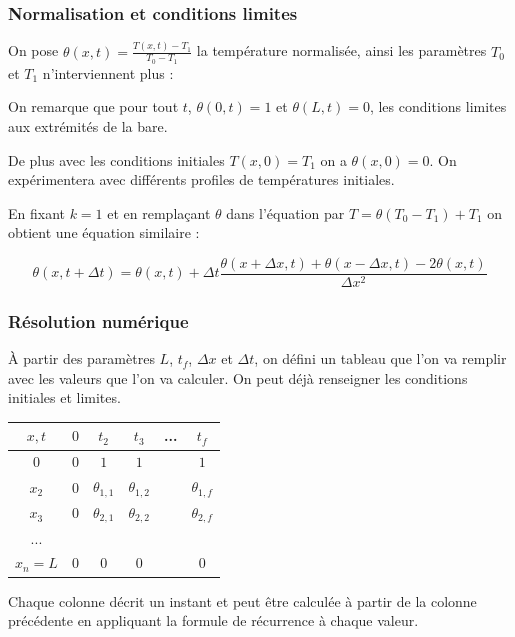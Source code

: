 \documentclass{beamer}
\begin{document}
    \begin{frame}
    \frametitle{Normalisation et conditions limites}


    On pose $\theta(x,t) = \frac{T(x,t) -T_1}{T_0 - T_1}$ la température normalisée,
    ainsi les paramètres $T_0$ et $T_1$ n'interviennent plus :

    \medskip

    On remarque que pour tout $t$, $\theta(0, t) = 1$ et $\theta(L, t) = 0$, les conditions limites aux extrémités de la bare.

    \medskip

    De plus avec les conditions initiales $T(x,0)=T_1$ on a $\theta(x, 0) = 0$. On expérimentera avec différents profiles de températures initiales.

    \bigskip

    En fixant $k = 1$ et en remplaçant $\theta$ dans l'équation par $T = \theta(T_0 - T_1) + T_1$ on obtient une équation similaire :

    $$\boxed{\theta(x, t + \Delta t) = \theta(x, t) + \Delta t \frac{\theta(x+ \Delta x, t) + \theta(x-\Delta x, t) -2\theta(x, t)}{\Delta x ^2 }}$$


    \end{frame}


    \begin{frame}
    \frametitle{Résolution numérique}

    À partir des paramètres $L$, $t_f$, $\Delta x$ et $\Delta t$, on défini un tableau que l'on va remplir avec les valeurs que l'on va calculer. On peut déjà renseigner les conditions initiales et limites.

    \begin{center}
	    \begin{tabular}{ |c|c|c|c|c|c| }
	     \hline
	     $x, t$ & $0$ & $t_2$ & $t_3$ & ... & $t_f$ \\
	     \hline
	     $0$   & $0$ & $1$ & $1$ &  & $1$\\
	     $x_2$ & $0$ & $\theta_{1,1}$ & $\theta_{1,2}$ &  & $\theta_{1,f}$\\
	     $x_3$ & $0$ & $\theta_{2,1}$ & $\theta_{2,2}$ &  & $\theta_{2,f}$\\
	     ... &   &   &   &  &  \\
	     $x_n = L$ &   $0$ & $0$ & $0$ &  & $0$\\
	     \hline
	    \end{tabular}
  	\end{center}

  	Chaque colonne décrit un instant et peut être calculée à partir de la colonne précédente en appliquant la formule de récurrence à chaque valeur.

    \end{frame}
\end{document}
